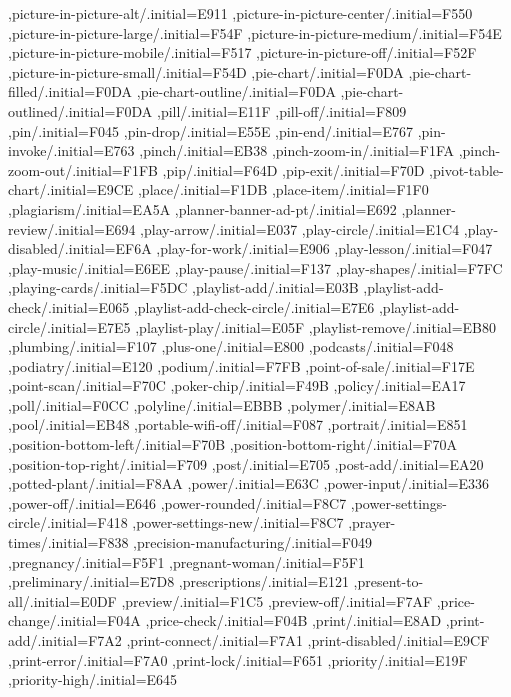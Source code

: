 { ,picture-in-picture-alt/.initial=E911
 ,picture-in-picture-center/.initial=F550
 ,picture-in-picture-large/.initial=F54F
 ,picture-in-picture-medium/.initial=F54E
 ,picture-in-picture-mobile/.initial=F517
 ,picture-in-picture-off/.initial=F52F
 ,picture-in-picture-small/.initial=F54D
 ,pie-chart/.initial=F0DA
 ,pie-chart-filled/.initial=F0DA
 ,pie-chart-outline/.initial=F0DA
 ,pie-chart-outlined/.initial=F0DA
 ,pill/.initial=E11F
 ,pill-off/.initial=F809
 ,pin/.initial=F045
 ,pin-drop/.initial=E55E
 ,pin-end/.initial=E767
 ,pin-invoke/.initial=E763
 ,pinch/.initial=EB38
 ,pinch-zoom-in/.initial=F1FA
 ,pinch-zoom-out/.initial=F1FB
 ,pip/.initial=F64D
 ,pip-exit/.initial=F70D
 ,pivot-table-chart/.initial=E9CE
 ,place/.initial=F1DB
 ,place-item/.initial=F1F0
 ,plagiarism/.initial=EA5A
 ,planner-banner-ad-pt/.initial=E692
 ,planner-review/.initial=E694
 ,play-arrow/.initial=E037
 ,play-circle/.initial=E1C4
 ,play-disabled/.initial=EF6A
 ,play-for-work/.initial=E906
 ,play-lesson/.initial=F047
 ,play-music/.initial=E6EE
 ,play-pause/.initial=F137
 ,play-shapes/.initial=F7FC
 ,playing-cards/.initial=F5DC
 ,playlist-add/.initial=E03B
 ,playlist-add-check/.initial=E065
 ,playlist-add-check-circle/.initial=E7E6
 ,playlist-add-circle/.initial=E7E5
 ,playlist-play/.initial=E05F
 ,playlist-remove/.initial=EB80
 ,plumbing/.initial=F107
 ,plus-one/.initial=E800
 ,podcasts/.initial=F048
 ,podiatry/.initial=E120
 ,podium/.initial=F7FB
 ,point-of-sale/.initial=F17E
 ,point-scan/.initial=F70C
 ,poker-chip/.initial=F49B
 ,policy/.initial=EA17
 ,poll/.initial=F0CC
 ,polyline/.initial=EBBB
 ,polymer/.initial=E8AB
 ,pool/.initial=EB48
 ,portable-wifi-off/.initial=F087
 ,portrait/.initial=E851
 ,position-bottom-left/.initial=F70B
 ,position-bottom-right/.initial=F70A
 ,position-top-right/.initial=F709
 ,post/.initial=E705
 ,post-add/.initial=EA20
 ,potted-plant/.initial=F8AA
 ,power/.initial=E63C
 ,power-input/.initial=E336
 ,power-off/.initial=E646
 ,power-rounded/.initial=F8C7
 ,power-settings-circle/.initial=F418
 ,power-settings-new/.initial=F8C7
 ,prayer-times/.initial=F838
 ,precision-manufacturing/.initial=F049
 ,pregnancy/.initial=F5F1
 ,pregnant-woman/.initial=F5F1
 ,preliminary/.initial=E7D8
 ,prescriptions/.initial=E121
 ,present-to-all/.initial=E0DF
 ,preview/.initial=F1C5
 ,preview-off/.initial=F7AF
 ,price-change/.initial=F04A
 ,price-check/.initial=F04B
 ,print/.initial=E8AD
 ,print-add/.initial=F7A2
 ,print-connect/.initial=F7A1
 ,print-disabled/.initial=E9CF
 ,print-error/.initial=F7A0
 ,print-lock/.initial=F651
 ,priority/.initial=E19F
 ,priority-high/.initial=E645
}
